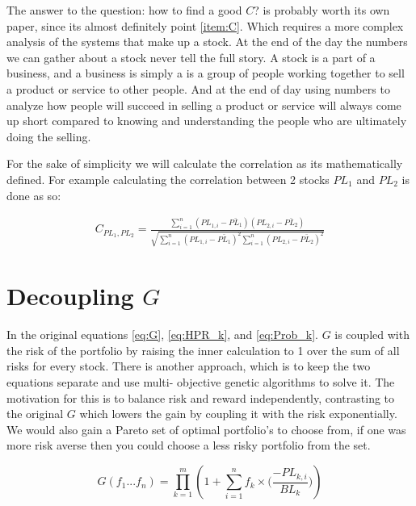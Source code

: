 \documentclass[11pt]{article}
\begin{document}
    The answer to the question: how to find a good \(C\)? is probably worth its own paper, since
    its almost definitely point \ref{item:C}. Which requires a more complex analysis of the systems
    that make up a stock. At the end of the day the numbers we can gather about a stock never
    tell the full story. A stock is a part of a business, and a business is simply a is a
    group of people working together to sell a product or service to other people.
    And at the end of day using numbers to analyze how people will succeed in selling
    a product or service will always come up short compared to knowing and understanding
    the people who are ultimately doing the selling.

    For the sake of simplicity we will calculate the correlation as its mathematically defined.
    For example calculating the correlation between 2 stocks \(PL_1\) and \(PL_2\) is
    done as so:

    \begin{align}
        C_{PL_1, PL_2} = 
        \frac{
            \displaystyle\sum^{n}_{i=1} (PL_{1, i} - \bar {PL_1})(PL_{2, i} - \bar {PL_2})
        }{
            \sqrt{
                \displaystyle\sum^{n}_{i=1}(PL_{1,i} - \bar {PL_1})^2 
                \displaystyle\sum^{n}_{i=1}(PL_{2,i} - \bar {PL_2})^2
            }
        }
        \label{eq:Correlation}
    \end{align}

\section{Decoupling \(G\)}

    In the original equations \ref{eq:G}, \ref{eq:HPR_k}, and \ref{eq:Prob_k}.
    \(G\) is coupled with the risk of the portfolio
    by raising the inner calculation to 1 over the sum of all risks for every stock.
    There is another approach, which is to keep the two equations separate and use multi-
    objective genetic algorithms to solve it. The motivation for this is to balance risk
    and reward independently, contrasting to the original \(G\) which lowers the gain
    by coupling it with the risk exponentially. We would also gain a Pareto set of
    optimal portfolio's to choose from, if one was more risk averse then you could choose
    a less risky portfolio from the set.

    \begin{equation}\label{eq:DecoupleG}
        G(f_1...f_n) = \displaystyle\prod^{m}_{k=1} \left(
                1 + \displaystyle\sum^{n}_{i=1} f_k \times \Big(
                    \frac{- PL_{k,i} }{BL_k}
                \Big)
            \right)
    \end{equation}
\end{document}
